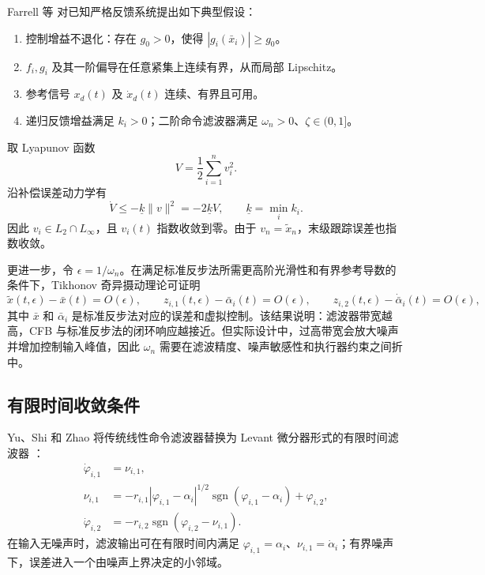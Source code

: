\documentclass[UTF8,a4paper,11pt,fontset=fandol]{ctexart}
\begin{document}
Farrell 等 \cite{Farrell2009CFB} 对已知严格反馈系统提出如下典型假设：
\begin{enumerate}
  \item 控制增益不退化：存在 $g_0>0$，使得 $|g_i(\bar{x}_i)|\ge g_0$。
  \item $f_i,g_i$ 及其一阶偏导在任意紧集上连续有界，从而局部 Lipschitz。
  \item 参考信号 $x_d(t)$ 及 $\dot{x}_d(t)$ 连续、有界且可用。
  \item 递归反馈增益满足 $k_i>0$；二阶命令滤波器满足 $\omega_n>0$、$\zeta\in(0,1]$。
\end{enumerate}

取 Lyapunov 函数
\begin{equation}
  V=\frac{1}{2}\sum_{i=1}^{n}v_i^2 .
\end{equation}
沿补偿误差动力学有
\begin{equation}
  \dot{V}\le -\underline{k}\|v\|^2=-2\underline{k}V,
  \qquad
  \underline{k}=\min_i k_i .
\end{equation}
因此 $v_i\in L_2\cap L_\infty$，且 $v_i(t)$ 指数收敛到零。由于 $v_n=\tilde{x}_n$，末级跟踪误差也指数收敛。

更进一步，令 $\epsilon=1/\omega_n$。在满足标准反步法所需更高阶光滑性和有界参考导数的条件下，Tikhonov 奇异摄动理论可证明
\begin{equation}
  \tilde{x}(t,\epsilon)-\bar{x}(t)=O(\epsilon),\qquad
  z_{i,1}(t,\epsilon)-\bar{\alpha}_i(t)=O(\epsilon),\qquad
  z_{i,2}(t,\epsilon)-\dot{\bar{\alpha}}_i(t)=O(\epsilon),
\end{equation}
其中 $\bar{x}$ 和 $\bar{\alpha}_i$ 是标准反步法对应的误差和虚拟控制。该结果说明：滤波器带宽越高，CFB 与标准反步法的闭环响应越接近。但实际设计中，过高带宽会放大噪声并增加控制输入峰值，因此 $\omega_n$ 需要在滤波精度、噪声敏感性和执行器约束之间折中。

\subsection{有限时间收敛条件}

Yu、Shi 和 Zhao 将传统线性命令滤波器替换为 Levant 微分器形式的有限时间滤波器 \cite{Yu2018FiniteTime}：
\begin{align}
  \dot{\varphi}_{i,1}&=\nu_{i,1},\\
  \nu_{i,1}&=-r_{i,1}|\varphi_{i,1}-\alpha_i|^{1/2}\operatorname{sgn}(\varphi_{i,1}-\alpha_i)+\varphi_{i,2},\\
  \dot{\varphi}_{i,2}&=-r_{i,2}\operatorname{sgn}(\varphi_{i,2}-\nu_{i,1}).
\end{align}
在输入无噪声时，滤波输出可在有限时间内满足 $\varphi_{i,1}=\alpha_i$、$\nu_{i,1}=\dot{\alpha}_i$；有界噪声下，误差进入一个由噪声上界决定的小邻域。
\end{document}
